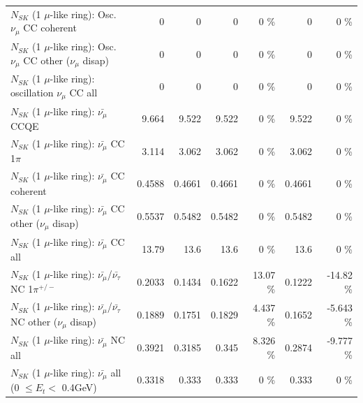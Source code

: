 \begin{table}
\begin{tabular}{| l | r | r | r  r | r  r |}
                        $N_{SK}$ (1 $\mu$-like ring): Osc. $\nu_\mu$ CC coherent &               0 &               0 &               0 &        0 \%  &               0 &        0 \%  \\ 
         $N_{SK}$ (1 $\mu$-like ring): Osc. $\nu_\mu$ CC other ($\nu_\mu$ disap) &               0 &               0 &               0 &        0 \%  &               0 &        0 \%  \\ 
                      $N_{SK}$ (1 $\mu$-like ring): oscillation $\nu_\mu$ CC all &               0 &               0 &               0 &        0 \%  &               0 &        0 \%  \\ 
\hline
\hline
                              $N_{SK}$ (1 $\mu$-like ring): $\bar{\nu_\mu}$ CCQE &           9.664 &           9.522 &           9.522 &        0 \%  &           9.522 &        0 \%  \\ 
                         $N_{SK}$ (1 $\mu$-like ring): $\bar{\nu_\mu}$ CC 1$\pi$ &           3.114 &           3.062 &           3.062 &        0 \%  &           3.062 &        0 \%  \\ 
                       $N_{SK}$ (1 $\mu$-like ring): $\bar{\nu_\mu}$ CC coherent &          0.4588 &          0.4661 &          0.4661 &        0 \%  &          0.4661 &        0 \%  \\ 
        $N_{SK}$ (1 $\mu$-like ring): $\bar{\nu_\mu}$ CC other ($\nu_\mu$ disap) &          0.5537 &          0.5482 &          0.5482 &        0 \%  &          0.5482 &        0 \%  \\ 
                          $N_{SK}$ (1 $\mu$-like ring): $\bar{\nu_{\mu}}$ CC all &           13.79 &            13.6 &            13.6 &        0 \%  &            13.6 &        0 \%  \\ 
\hline
  $N_{SK}$ (1 $\mu$-like ring): $\bar{\nu_\mu}$/$\bar{\nu_\tau}$ NC 1$\pi^{+/-}$ &          0.2033 &          0.1434 &          0.1622 &    13.07 \%  &          0.1222 &   -14.82 \%  \\ 
$N_{SK}$ (1 $\mu$-like ring): $\bar{\nu_\mu}$/$\bar{\nu_\tau}$ NC other ($\nu_\mu$ disap) &          0.1889 &          0.1751 &          0.1829 &    4.437 \%  &          0.1652 &   -5.643 \%  \\ 
                          $N_{SK}$ (1 $\mu$-like ring): $\bar{\nu_{\mu}}$ NC all &          0.3921 &          0.3185 &           0.345 &    8.326 \%  &          0.2874 &   -9.777 \%  \\ 
\hline
   $N_{SK}$ (1 $\mu$-like ring): $\bar{\nu_{\mu}}$ all (0 $\leq E_{t} <$ 0.4GeV) &          0.3318 &           0.333 &           0.333 &        0 \%  &           0.333 &        0 \%  \\ 

\end{tabular}
\end{table}
